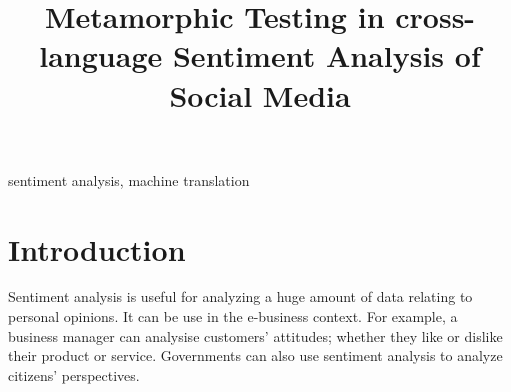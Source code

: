 \documentclass[conference]{IEEEtran}
\begin{document}
\title{\huge Metamorphic Testing in cross-language Sentiment Analysis of Social Media}

\author{
\and
{}
\and
{}
\and
{}
}

\maketitle

\begin{abstract}
\end{abstract}

\begin{IEEEkeywords}
sentiment analysis, machine translation
\end{IEEEkeywords}

\section{Introduction}

\nocite{*}





\cite{Senn:2009}


Sentiment analysis is useful for analyzing a huge amount of data relating to personal
opinions.
It can be use in the e-business context. For example, a business manager can analysise
customers’ attitudes; whether they like or dislike their product or service.
Governments can also use sentiment analysis to analyze citizens' perspectives.
\end{document}
